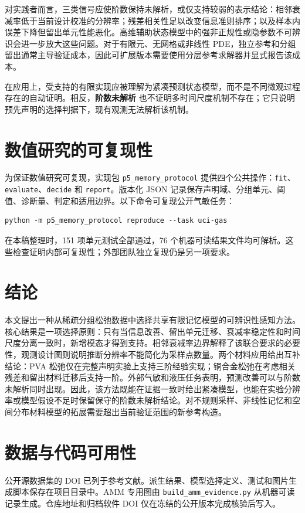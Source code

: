 \documentclass[UTF8,11pt]{ctexart}
\newcommand{\indet}{\textup{\bfseries 阶数未解析}}
\begin{document}
对实践者而言，三类信号应使阶数保持未解析，或仅支持较弱的表示结论：相邻衰减率低于当前设计校准的分辨率；残差相关性足以改变信息准则排序；以及样本内误差下降但留出单元性能恶化。高维辅助状态模型中的强非正规性或隐参数不可辨识会进一步放大这些问题。对于有限元、无网格或非线性 PDE，独立参考和分组留出通常主导验证成本，因此可扩展版本需要使用分层参考求解器并显式报告该成本。

在应用上，受支持的有限实现应被理解为紧凑预测状态模型，而不是不同微观过程存在的自动证明。相反，\indet{} 也不证明多时间尺度机制不存在；它只说明预先声明的选择判据下，现有观测无法解析该机制。

\section{数值研究的可复现性}
为保证数值研究可复现，实现包 \texttt{p5\_memory\_protocol} 提供四个公共操作：\texttt{fit}、\texttt{evaluate}、\texttt{decide} 和 \texttt{report}。版本化 JSON 记录保存声明域、分组单元、阈值、诊断量、判定和适用边界。以下命令可复现公开气敏任务：
\begin{verbatim}
python -m p5_memory_protocol reproduce --task uci-gas
\end{verbatim}
在本稿整理时，151 项单元测试全部通过，76 个机器可读结果文件均可解析。这些检查证明内部可复现性；外部团队独立复现仍是另一项要求。

\section{结论}
本文提出一种从稀疏分组松弛数据中选择共享有限记忆模型的可辨识性感知方法。核心结果是一项选择原则：只有当信息改善、留出单元迁移、衰减率稳定性和时间尺度分离一致时，新增模态才得到支持。相邻衰减率边界解释了该联合要求的必要性，观测设计图则说明推断分辨率不能简化为采样点数量。两个材料应用给出互补结论：PVA 松弛仅在完整声明实验上支持三阶经验实现；铜合金松弛在考虑相关残差和留出材料迁移后支持一阶。外部气敏和液压任务表明，预测改善可以与阶数未解析同时出现。因此，该方法既能在证据一致时给出紧凑模型，也能在实验分辨率或模型假设不足时保留保守的阶数未解析结论。对不规则采样、非线性记忆和空间分布材料模型的拓展需要超出当前验证范围的新参考构造。

\section*{数据与代码可用性}
公开源数据集的 DOI 已列于参考文献。派生结果、模型选择定义、测试和图片生成脚本保存在项目目录中。AMM 专用图由 \texttt{build\_amm\_evidence.py} 从机器可读记录生成。仓库地址和归档软件 DOI 仅在冻结的公开版本完成核验后写入。
\end{document}
